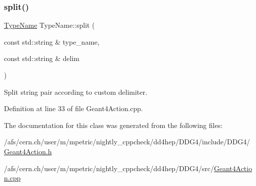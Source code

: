\hypertarget{class_d_d4hep_1_1_simulation_1_1_type_name_aea4683be81c648ca2e441df288edef48}{}\label{class_d_d4hep_1_1_simulation_1_1_type_name_aea4683be81c648ca2e441df288edef48} 
\subsubsection{\texorpdfstring{split()}{split()}\hspace{0.1cm}{\footnotesize\ttfamily [2/2]}}
{\footnotesize\ttfamily \hyperlink{class_d_d4hep_1_1_simulation_1_1_type_name}{Type\+Name} Type\+Name\+::split (\begin{DoxyParamCaption}\item[{const std\+::string \&}]{type\+\_\+name,  }\item[{const std\+::string \&}]{delim }\end{DoxyParamCaption})\hspace{0.3cm}{\ttfamily [static]}}



Split string pair according to custom delimiter. 



Definition at line 33 of file Geant4\+Action.\+cpp.



The documentation for this class was generated from the following files\+:\begin{DoxyCompactItemize}
\item 
/afs/cern.\+ch/user/m/mpetric/nightly\+\_\+cppcheck/dd4hep/\+D\+D\+G4/include/\+D\+D\+G4/\hyperlink{_geant4_action_8h}{Geant4\+Action.\+h}\item 
/afs/cern.\+ch/user/m/mpetric/nightly\+\_\+cppcheck/dd4hep/\+D\+D\+G4/src/\hyperlink{_geant4_action_8cpp}{Geant4\+Action.\+cpp}\end{DoxyCompactItemize}
